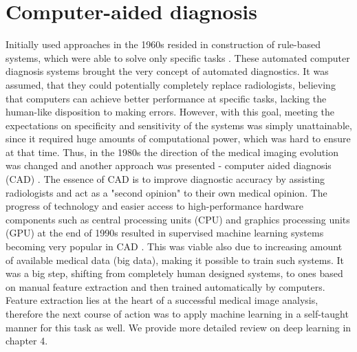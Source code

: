\section{Computer-aided diagnosis}
Initially used approaches in the 1960s resided in construction of rule-based systems, which were able to solve only specific tasks \cite{surveyOnImageing}. These automated computer diagnosis systems brought the very concept of automated diagnostics. It was assumed, that they could potentially completely replace radiologists, believing that computers can achieve better performance at specific tasks, lacking the human-like disposition to making errors. However, with this goal, meeting the expectations on specificity and sensitivity of the systems was simply unattainable, since it required huge amounts of computational power, which was hard to ensure at that time. Thus, in the 1980s the direction of the medical imaging evolution was changed and another approach was presented - computer aided diagnosis (CAD) \cite{diagnostic50years}. The essence of CAD is to improve diagnostic accuracy by assisting radiologists and act as a "second opinion" \cite{surveyOnImageing, CADinmedicalImaging} to their own medical opinion. 
The progress of technology and easier access to high-performance hardware components such as central processing units (CPU) and graphics processing units (GPU) at the end of 1990s resulted in supervised machine learning systems becoming very popular in CAD \cite{surveyOnImageing}. This was viable also due to increasing amount of available medical data (big data), making it possible to train such systems. It was a big step, shifting from completely human designed systems, to ones based on manual feature extraction and then trained automatically by computers. Feature extraction lies at the heart of a successful medical image analysis, therefore the next course of action was to apply machine learning in a self-taught manner for this task as well. We provide more detailed review on deep learning in chapter 4.




